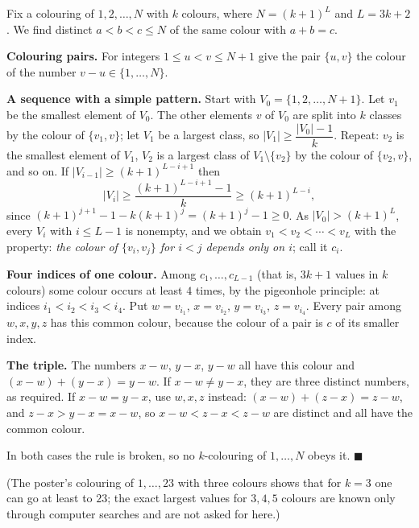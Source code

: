 Fix a colouring of $1,2,\dots,N$ with $k$ colours, where $N=(k+1)^{L}$ and $L=3k+2$. We find distinct $a<b<c\le N$ of the same colour with $a+b=c$.

\textbf{Colouring pairs.} For integers $1\le u<v\le N+1$ give the pair $\{u,v\}$ the colour of the number $v-u\in\{1,\dots,N\}$.

\textbf{A sequence with a simple pattern.} Start with $V_0=\{1,2,\dots,N+1\}$. Let $v_1$ be the smallest element of $V_0$. The other elements $v$ of $V_0$ are split into $k$ classes by the colour of $\{v_1,v\}$; let $V_1$ be a largest class, so $|V_1|\ge\dfrac{|V_0|-1}{k}$. Repeat: $v_2$ is the smallest element of $V_1$, $V_2$ is a largest class of $V_1\setminus\{v_2\}$ by the colour of $\{v_2,v\}$, and so on. If $|V_{i-1}|\ge(k+1)^{L-i+1}$ then
\[
|V_i|\ge\dfrac{(k+1)^{L-i+1}-1}{k}\ge(k+1)^{L-i},
\]
since $(k+1)^{j+1}-1-k(k+1)^j=(k+1)^j-1\ge0$. As $|V_0|>(k+1)^L$, every $V_i$ with $i\le L-1$ is nonempty, and we obtain $v_1<v_2<\cdots<v_L$ with the property: \emph{the colour of $\{v_i,v_j\}$ for $i<j$ depends only on $i$}; call it $c_i$.

\textbf{Four indices of one colour.} Among $c_1,\dots,c_{L-1}$ (that is, $3k+1$ values in $k$ colours) some colour occurs at least $4$ times, by the pigeonhole principle: at indices $i_1<i_2<i_3<i_4$. Put $w=v_{i_1}$, $x=v_{i_2}$, $y=v_{i_3}$, $z=v_{i_4}$. Every pair among $w,x,y,z$ has this common colour, because the colour of a pair is $c$ of its smaller index.

\textbf{The triple.} The numbers $x-w$, $y-x$, $y-w$ all have this colour and $(x-w)+(y-x)=y-w$. If $x-w\ne y-x$, they are three distinct numbers, as required. If $x-w=y-x$, use $w,x,z$ instead: $(x-w)+(z-x)=z-w$, and $z-x>y-x=x-w$, so $x-w<z-x<z-w$ are distinct and all have the common colour.

In both cases the rule is broken, so no $k$-colouring of $1,\dots,N$ obeys it. $\blacksquare$

(The poster's colouring of $1,\dots,23$ with three colours shows that for $k=3$ one can go at least to $23$; the exact largest values for $3,4,5$ colours are known only through computer searches and are not asked for here.)

